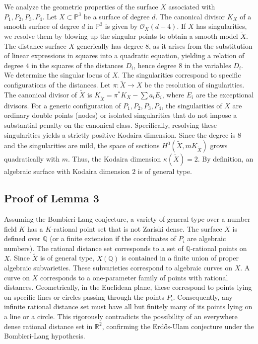 \documentclass[12pt,a4paper]{article}
\begin{document}
We analyze the geometric properties of the surface $X$ associated with $P_1, P_2, P_3, P_4$.
Let $X \subset \mathbb{P}^3$ be a surface of degree $d$. The canonical divisor $K_X$ of a smooth surface of degree $d$ in $\mathbb{P}^3$ is given by $\mathcal{O}_X(d - 4)$. If $X$ has singularities, we resolve them by blowing up the singular points to obtain a smooth model $\tilde{X}$.
The distance surface $X$ generically has degree $8$, as it arises from the substitution of linear expressions in squares into a quadratic equation, yielding a relation of degree $4$ in the squares of the distances $D_i$, hence degree $8$ in the variables $D_i$.
We determine the singular locus of $X$. The singularities correspond to specific configurations of the distances. Let $\pi: \tilde{X} \to X$ be the resolution of singularities. The canonical divisor of $\tilde{X}$ is $K_{\tilde{X}} = \pi^* K_X - \sum a_i E_i$, where $E_i$ are the exceptional divisors.
For a generic configuration of $P_1, P_2, P_3, P_4$, the singularities of $X$ are ordinary double points (nodes) or isolated singularities that do not impose a substantial penalty on the canonical class. Specifically, resolving these singularities yields a strictly positive Kodaira dimension.
Since the degree is $8$ and the singularities are mild, the space of sections $H^0(\tilde{X}, mK_{\tilde{X}})$ grows quadratically with $m$. Thus, the Kodaira dimension $\kappa(\tilde{X}) = 2$. By definition, an algebraic surface with Kodaira dimension $2$ is of general type.

\subsection{Proof of Lemma 3}

Assuming the Bombieri-Lang conjecture, a variety of general type over a number field $K$ has a $K$-rational point set that is not Zariski dense.
The surface $X$ is defined over $\mathbb{Q}$ (or a finite extension if the coordinates of $P_i$ are algebraic numbers). The rational distance set corresponds to a set of $\mathbb{Q}$-rational points on $X$.
Since $\tilde{X}$ is of general type, $X(\mathbb{Q})$ is contained in a finite union of proper algebraic subvarieties. These subvarieties correspond to algebraic curves on $X$.
A curve on $X$ corresponds to a one-parameter family of points with rational distances. Geometrically, in the Euclidean plane, these correspond to points lying on specific lines or circles passing through the points $P_i$.
Consequently, any infinite rational distance set must have all but finitely many of its points lying on a line or a circle. This rigorously contradicts the possibility of an everywhere dense rational distance set in $\mathbb{R}^2$, confirming the Erd\H{o}s-Ulam conjecture under the Bombieri-Lang hypothesis.
\end{document}

